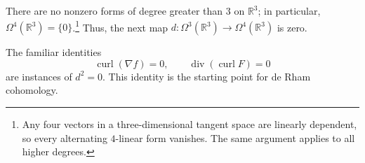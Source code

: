     There are no nonzero forms of degree greater than $3$ on $\mathbb{R}^3$;
    in particular, $\Omega^4(\mathbb{R}^3)=\{0\}$.\footnote{%
        Any four vectors in a three-dimensional tangent space are linearly
        dependent, so every alternating $4$-linear form vanishes. The same
        argument applies to all higher degrees.}
    Thus, the next map $d\colon\Omega^3(\mathbb{R}^3)\to\Omega^4(\mathbb{R}^3)$
    is zero.

    The familiar identities
    \[
        \operatorname{curl}(\nabla f) = 0,
        \qquad
        \operatorname{div}(\operatorname{curl} F) = 0
    \]
    are instances of $d^2 = 0$. This identity is the starting point for de Rham
    cohomology.
